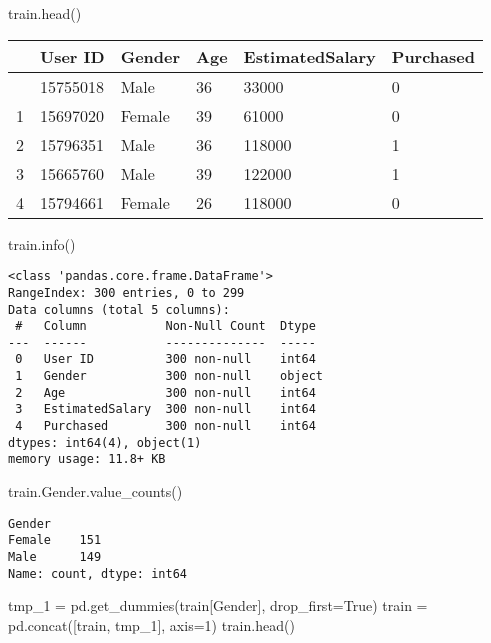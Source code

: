 \documentclass[
  letterpaper,
  DIV=11,
  numbers=noendperiod]{scrreprt}
\newenvironment{Shaded}{\begin{snugshade}}{\end{snugshade}}
\newcommand{\DecValTok}[1]{\textcolor[rgb]{0.68,0.00,0.00}{#1}}
\newcommand{\NormalTok}[1]{\textcolor[rgb]{0.00,0.23,0.31}{#1}}
\newcommand{\OperatorTok}[1]{\textcolor[rgb]{0.37,0.37,0.37}{#1}}
\newcommand{\StringTok}[1]{\textcolor[rgb]{0.13,0.47,0.30}{#1}}
\newcommand{\VariableTok}[1]{\textcolor[rgb]{0.07,0.07,0.07}{#1}}
\begin{document}
\begin{Shaded}
\begin{Highlighting}[]
\NormalTok{train.head()}
\end{Highlighting}
\end{Shaded}

\begin{longtable}[]{@{}llllll@{}}
\toprule\noalign{}
& User ID & Gender & Age & EstimatedSalary & Purchased \\
\midrule\noalign{}
\endhead
\bottomrule\noalign{}
\endlastfoot
0 & 15755018 & Male & 36 & 33000 & 0 \\
1 & 15697020 & Female & 39 & 61000 & 0 \\
2 & 15796351 & Male & 36 & 118000 & 1 \\
3 & 15665760 & Male & 39 & 122000 & 1 \\
4 & 15794661 & Female & 26 & 118000 & 0 \\
\end{longtable}

\begin{Shaded}
\begin{Highlighting}[]
\NormalTok{train.info()}
\end{Highlighting}
\end{Shaded}

\begin{verbatim}
<class 'pandas.core.frame.DataFrame'>
RangeIndex: 300 entries, 0 to 299
Data columns (total 5 columns):
 #   Column           Non-Null Count  Dtype 
---  ------           --------------  ----- 
 0   User ID          300 non-null    int64 
 1   Gender           300 non-null    object
 2   Age              300 non-null    int64 
 3   EstimatedSalary  300 non-null    int64 
 4   Purchased        300 non-null    int64 
dtypes: int64(4), object(1)
memory usage: 11.8+ KB
\end{verbatim}

\begin{Shaded}
\begin{Highlighting}[]
\NormalTok{train.Gender.value\_counts()}
\end{Highlighting}
\end{Shaded}

\begin{verbatim}
Gender
Female    151
Male      149
Name: count, dtype: int64
\end{verbatim}

\begin{Shaded}
\begin{Highlighting}[]
\NormalTok{tmp\_1 }\OperatorTok{=}\NormalTok{ pd.get\_dummies(train[}\StringTok{\textquotesingle{}Gender\textquotesingle{}}\NormalTok{], drop\_first}\OperatorTok{=}\VariableTok{True}\NormalTok{)}
\NormalTok{train }\OperatorTok{=}\NormalTok{ pd.concat([train, tmp\_1], axis}\OperatorTok{=}\DecValTok{1}\NormalTok{)}
\NormalTok{train.head()}
\end{Highlighting}
\end{Shaded}
\end{document}
